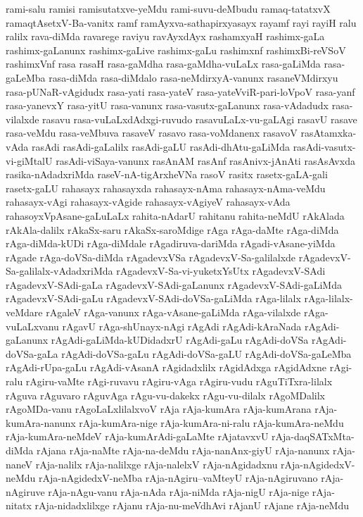 {rami-salu
ramisi
ramisutatxve-yeMdu
rami-suvu-deMbudu
ramaq-tatatxvX
ramaqtAsetxV-Ba-vanitx
ramf
ramAyxva-sathapirxyasayx
rayamf
rayi
rayiH
ralu
ralilx
rava-diMda
ravarege
raviyu
ravAyxdAyx
rashamxyaH
rashimx-gaLa
rashimx-gaLanunx
rashimx-gaLive
rashimx-gaLu
rashimxnf
rashimxBi-reVSoV
rashimxVnf
rasa
rasaH
rasa-gaMdha
rasa-gaMdha-vuLaLx
rasa-gaLiMda
rasa-gaLeMba
rasa-diMda
rasa-diMdalo
rasa-neMdirxyA-vanunx
rasaneVMdirxyu
rasa-pUNaR-vAgidudx
rasa-yati
rasa-yateV
rasa-yateVviR-pari-loVpoV
rasa-yanf
rasa-yanevxY
rasa-yitU
rasa-vanunx
rasa-vasutx-gaLanunx
rasa-vAdadudx
rasa-vilalxde
rasavu
rasa-vuLaLxdAdxgi-ruvudo
rasavuLaLx-vu-gaLAgi
rasavU
rasave
rasa-veMdu
rasa-veMbuva
rasaveV
rasavo
rasa-voMdanenx
rasavoV
rasAtamxka-vAda
rasAdi
rasAdi-gaLalilx
rasAdi-gaLU
rasAdi-dhAtu-gaLiMda
rasAdi-vasutx-vi-giMtalU
rasAdi-viSaya-vanunx
rasAnAM
rasAnf
rasAnivx-jAnAti
rasAsAvxda
rasika-nAdadxriMda
raseV-nA-tigArxheVNa
rasoV
rasitx
rasetx-gaLA-gali
rasetx-gaLU
rahasayx
rahasayxda
rahasayx-nAma
rahasayx-nAma-veMdu
rahasayx-vAgi
rahasayx-vAgide
rahasayx-vAgiyeV
rahasayx-vAda
rahasoyxVpAsane-gaLuLaLx
rahita-nAdarU
rahitanu
rahita-neMdU
rAkAlada
rAkAla-dalilx
rAkaSx-saru
rAkaSx-saroMdige
rAga
rAga-daMte
rAga-diMda
rAga-diMda-kUDi
rAga-diMdale
rAgadiruva-dariMda
rAgadi-vAsane-yiMda
rAgade
rAga-doVSa-diMda
rAgadevxVSa
rAgadevxV-Sa-galilalxde
rAgadevxV-Sa-galilalx-vAdadxriMda
rAgadevxV-Sa-vi-yuketxYsUtx
rAgadevxV-SAdi
rAgadevxV-SAdi-gaLa
rAgadevxV-SAdi-gaLanunx
rAgadevxV-SAdi-gaLiMda
rAgadevxV-SAdi-gaLu
rAgadevxV-SAdi-doVSa-gaLiMda
rAga-lilalx
rAga-lilalx-veMdare
rAgaleV
rAga-vanunx
rAga-vAsane-gaLiMda
rAga-vilalxde
rAga-vuLaLxvanu
rAgavU
rAga-shUnayx-nAgi
rAgAdi
rAgAdi-kAraNada
rAgAdi-gaLanunx
rAgAdi-gaLiMda-kUDidadxrU
rAgAdi-gaLu
rAgAdi-doVSa
rAgAdi-doVSa-gaLa
rAgAdi-doVSa-gaLu
rAgAdi-doVSa-gaLU
rAgAdi-doVSa-gaLeMba
rAgAdi-rUpa-gaLu
rAgAdi-vAsanA
rAgidadxlilx
rAgidAdxga
rAgidAdxne
rAgi-ralu
rAgiru-vaMte
rAgi-ruvavu
rAgiru-vAga
rAgiru-vudu
rAguTiTxra-lilalx
rAguva
rAguvaro
rAguvAga
rAgu-vu-dakekx
rAgu-vu-dilalx
rAgoMDalilx
rAgoMDa-vanu
rAgoLaLxlilalxvoV
rAja
rAja-kumAra
rAja-kumArana
rAja-kumAra-nanunx
rAja-kumAra-nige
rAja-kumAra-ni-ralu
rAja-kumAra-neMdu
rAja-kumAra-neMdeV
rAja-kumArAdi-gaLaMte
rAjatavxvU
rAja-daqSATxMta-diMda
rAjana
rAja-naMte
rAja-na-deMdu
rAja-nanAnx-giyU
rAja-nanunx
rAja-naneV
rAja-nalilx
rAja-nalilxge
rAja-nalelxV
rAja-nAgidadxnu
rAja-nAgidedxV-neMdu
rAja-nAgidedxV-neMba
rAja-nAgiru--vaMteyU
rAja-nAgiruvano
rAja-nAgiruve
rAja-nAgu-vanu
rAja-nAda
rAja-niMda
rAja-nigU
rAja-nige
rAja-nitatx
rAja-nidadxlilxge
rAjanu
rAja-nu-meVdhAvi
rAjanU
rAjane
rAja-neMdu
}
